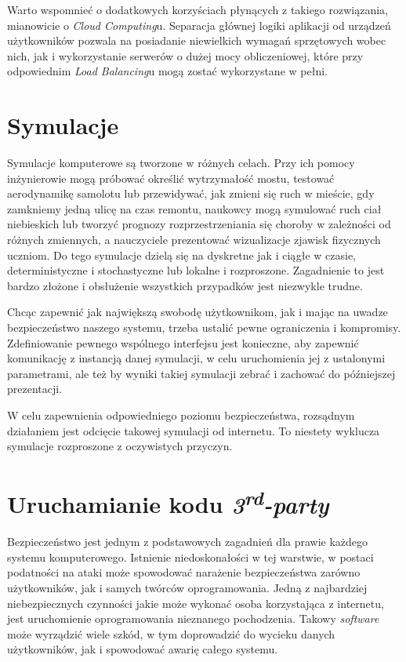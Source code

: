 \par Warto wspomnieć o dodatkowych korzyściach płynących z takiego rozwiązania, mianowicie o \emph{Cloud Computing}u. Separacja głównej logiki aplikacji od urządzeń użytkowników pozwala na posiadanie niewielkich wymagań sprzętowych wobec nich, jak i wykorzystanie serwerów o dużej mocy obliczeniowej, które przy odpowiednim \emph{Load Balancing}u mogą zostać wykorzystane w pełni.

\section{Symulacje}

\par Symulacje komputerowe są tworzone w różnych celach. Przy ich pomocy inżynierowie mogą próbować określić wytrzymałość mostu, testować aerodynamikę samolotu lub przewidywać, jak zmieni się ruch w mieście, gdy zamkniemy jedną ulicę na czas remontu, naukowcy mogą symulować ruch ciał niebieskich lub tworzyć prognozy rozprzestrzeniania się choroby w zależności od różnych zmiennych, a nauczyciele prezentować wizualizacje zjawisk fizycznych uczniom. Do tego symulacje dzielą się na dyskretne jak i ciągłe w czasie, deterministyczne i stochastyczne\cite{mchaney1991computer} lub lokalne i rozproszone. Zagadnienie to jest bardzo złożone i obsłużenie wszystkich przypadków jest niezwykle trudne.

\par Chcąc zapewnić jak największą swobodę użytkownikom, jak i mając na uwadze bezpieczeństwo naszego systemu, trzeba ustalić pewne ograniczenia i kompromisy. Zdefiniowanie pewnego wspólnego interfejsu jest konieczne, aby zapewnić komunikację z instancją danej symulacji, w celu uruchomienia jej z ustalonymi parametrami, ale też by wyniki takiej symulacji zebrać i zachować do późniejszej prezentacji.

\par W celu zapewnienia odpowiedniego poziomu bezpieczeństwa, rozsądnym działaniem jest odcięcie takowej symulacji od internetu. To niestety wyklucza symulacje rozproszone z oczywistych przyczyn.

\section{Uruchamianie kodu \emph{3\textsuperscript{rd}-party}}

\par Bezpieczeństwo jest jednym z podstawowych zagadnień dla prawie każdego systemu komputerowego. Istnienie niedoskonałości w tej warstwie, w postaci podatności na ataki może spowodować narażenie bezpieczeństwa zarówno użytkowników, jak i samych twórców oprogramowania. Jedną z najbardziej niebezpiecznych czynności jakie może wykonać osoba korzystająca z internetu, jest uruchomienie oprogramowania nieznanego pochodzenia. Takowy \emph{software} może wyrządzić wiele szkód, w tym doprowadzić do wycieku danych użytkowników, jak i spowodować awarię całego systemu.

